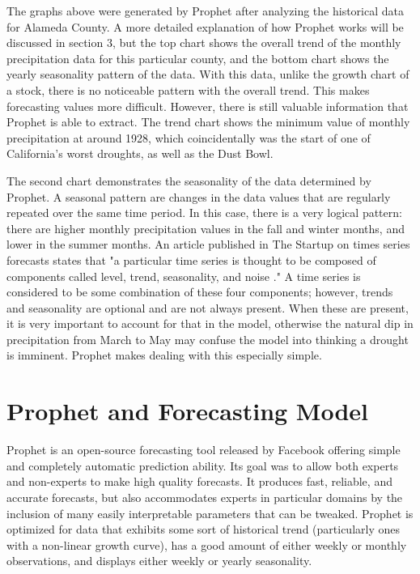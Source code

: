 \documentclass{article}
\begin{document}
The graphs above were generated by Prophet after analyzing the historical data for Alameda County. A more detailed explanation of how Prophet works will be discussed in section 3, but the top chart shows the overall trend of the monthly precipitation data for this particular county, and the bottom chart shows the yearly seasonality pattern of the data. With this data, unlike the growth chart of a stock, there is no noticeable pattern with the overall trend. This makes forecasting values more difficult. However, there is still valuable information that Prophet is able to extract. The trend chart shows the minimum value of monthly precipitation at around 1928, which coincidentally was the start of one of California's worst droughts, as well as the Dust Bowl. 

The second chart demonstrates the seasonality of the data determined by Prophet. A seasonal pattern are changes in the data values that are regularly repeated over the same time period. In this case, there is a very logical pattern: there are higher monthly precipitation values in the fall and winter months, and lower in the summer months. An article published in The Startup on times series forecasts states that "a particular time series is thought to be composed of components called level, trend, seasonality, and noise \cite{seasonal}." A time series is considered to be some combination of these four components; however, trends and seasonality are optional and are not always present. When these are present, it is very important to account for that in the model, otherwise the natural dip in precipitation from March to May may confuse the model into thinking a drought is imminent. Prophet makes dealing with this especially simple. 


\section{Prophet and Forecasting Model}
Prophet is an open-source forecasting tool \cite{prophet} released by Facebook offering simple and completely automatic prediction ability. Its goal was to allow both experts and non-experts to make high quality forecasts. It produces fast, reliable, and accurate forecasts, but also accommodates experts in particular domains by the inclusion of many easily interpretable parameters that can be tweaked. Prophet is optimized for data that exhibits some sort of historical trend (particularly ones with a non-linear growth curve), has a good amount of either weekly or monthly observations, and displays either weekly or yearly seasonality. 
\end{document}
